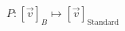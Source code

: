 \documentclass[preview]{standalone}
\begin{document}
\begin{align*}
P: [\vec{v}]_B \mapsto [\vec{v}]_{\text{Standard}}
\end{align*}
\end{document}
